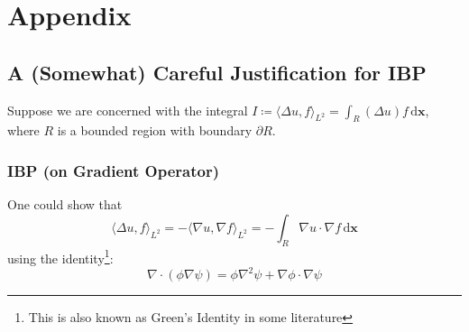 \documentclass[a4paper]{article}
\newcommand{\dxx}{\, \text{d} \mathbf{x}}
\theoremstyle{definition}
\begin{document}
\newpage
\section{Appendix}
\subsection{A (Somewhat) Careful Justification for IBP}
\label{sct: IBP Justification}
Suppose we are concerned with the integral $I \coloneqq \langle \Delta u, f \rangle_{L^2} = \int_{R} (\Delta u)f \dxx$, where $R$ is a bounded region with boundary $\partial R$.

%
%

\subsubsection{IBP (on Gradient Operator)}
One could show that 
\begin{equation}
    \langle \Delta u, f \rangle_{L^2} = - \langle \nabla u, \nabla f \rangle_{L^2} = - \int_{R} \nabla u \cdot \nabla f \dxx
    \label{equ: IBP Gradient}
\end{equation}
using the identity\footnote{This is also known as Green's Identity in some literature}:
\begin{equation}
\nabla \cdot \left( \phi \nabla \psi \right) = \phi \nabla^2 \psi + \nabla \phi \cdot \nabla \psi
    \label{equ: Green's Identity II}
\end{equation}
\end{document}
